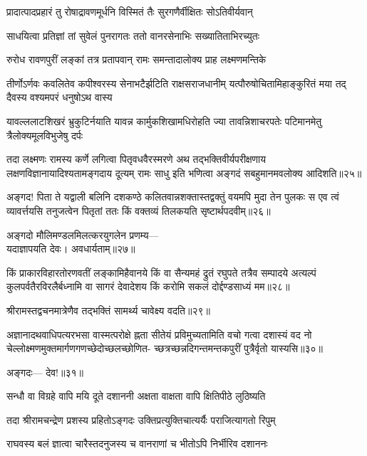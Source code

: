 \twolineshloka
{प्रादात्पादप्रहारं तु रोषाद्रावणमूर्धनि}
{विस्मितं तैः सुरगणैर्वीक्षितः सोऽतिवीर्यवान्} %

\twolineshloka
{साधयित्वा प्रतिज्ञां तां सुवेलं पुनरागतः}
{ततो वानरसेनाभिः सख्यातिताभिरच्युतः} %

\twolineshloka
{रुरोध रावणपुरीं लङ्कां तत्र प्रतापवान्}
{रामः समन्तादालोक्य प्राह लक्ष्मणमन्तिके} %

\fourlineindentedshloka
{तीर्णोऽर्णवः कवलितेव कपीश्वरस्य}
{सेनाभटैर्झटिति राक्षसराजधानीम्}
{यत्पौरुषोचितामिहाङ्कुरितं मया तद्}
{दैवस्य वश्यमपरं धनुषोऽथ वास्य} %


\fourlineindentedshloka
{यावल्ललाटशिखरं भ्रुकुटिर्नयाति}
{यावन्न कार्मुकशिखामधिरोहति ज्या}
{तावन्निशाचरपतेः पटिमानमेतु}
{त्रैलोक्यमूलविभुजेषु दर्पः} %


तदा लक्ष्मणः रामस्य कर्णे लगित्वा पितृवधवैरस्मरणे अथ 
तद्भक्तिवीर्यपरीक्षणाय लक्षणविज्ञानायादिश्यतामङ्गदाय दूत्यम्
रामः साधु इति भणित्वा अङ्गदं सबहुमानमवलोक्य आदिशति॥२५॥

अङ्गद! पिता ते यद्वाली बलिनि दशकण्ठे
कलितवान्नशक्तास्तद्वक्तुं वयमपि मुदा तेन पुलकः
स एव त्वं व्यावर्त्तयसि तनुजत्वेन पितृतां 
ततः किं वक्तव्यं तिलकयति सृष्टार्थपदवीम्॥२६॥

अङ्गदो मौलिमण्डलमिलत्करयुगलेन प्रणम्य---\\
यदाज्ञापयति देवः। अवधार्यताम्॥२७॥

किं प्राकारविहारतोरणवतीं लङ्कामिहैवानये
किं वा सैन्यमहं द्रुतं रघुपते तत्रैव सम्पादये
अत्यल्पं कुलपर्वतैरविरलैर्बध्नामि वा सागरं
देवादेशय किं करोमि सकलं दोर्द्दण्डसाध्यं मम॥२८॥

श्रीरामस्तद्वचनमात्रेणैव तद्भक्तिं सामर्थ्य चावेक्ष्य वदति॥२९॥

अज्ञानादथवाधिपत्यरभसा वास्मत्परोक्षे ह्नता सीतेयं
प्रविमुच्यतामिति वचो गत्वा दशास्यं वद
नो चेल्लोक्ष्मणमुक्तमार्गणगणच्छेदोच्छलच्छोणित-
च्छत्रच्छन्नदिगन्तमन्तकपुरीं पुत्रैर्वृतो यास्यसि॥३०॥

अङ्गदः--- देव!॥३१॥

\addtocounter{shlokacount}{7}
\twolineshloka
{सन्धौ वा विग्रहे वापि मयि दूते दशाननी}
{अक्षता वाक्षता वापि क्षितिपीठे लुठिष्यति} %

\twolineshloka
{तदा श्रीरामचन्द्रेण प्रशस्य प्रहितोऽङ्गदः}
{उक्तिप्रत्युक्तिचात्यर्यैः पराजित्यागतो रिपुम्} %

\twolineshloka
{राघवस्य बलं ज्ञात्वा चारैस्तदनुजस्य च}
{वानराणां च भीतोऽपि निर्भीरिव दशाननः} %

